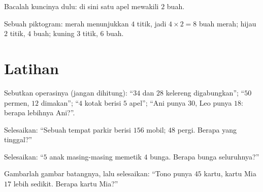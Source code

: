 \begin{example}\label{ex:g2:problems:pictogram}
Bacalah kuncinya dulu: di sini satu apel mewakili $2$ buah.

\begin{omfigure}

{\small Sebuah piktogram: merah menunjukkan $4$ titik, jadi
$4 \times 2 = 8$ buah merah; hijau $2$ titik, $4$ buah; kuning $3$
titik, $6$ buah.}
\end{omfigure}
\end{example}

\section{Latihan}

\begin{exercise}[$\star$]\label{exo:g2:problems:1}
Sebutkan operasinya (jangan dihitung): ``$34$ dan $28$ kelereng
digabungkan''; ``$50$ permen, $12$ dimakan''; ``$4$ kotak berisi $5$
apel''; ``Ani punya $30$, Leo punya $18$: berapa lebihnya Ani?''.
\end{exercise}

\begin{exercise}[$\star$]\label{exo:g2:problems:2}
Selesaikan: ``Sebuah tempat parkir berisi $156$ mobil; $48$ pergi. Berapa yang tinggal?''
\end{exercise}

\begin{exercise}[$\star$]\label{exo:g2:problems:3}
Selesaikan: ``$5$ anak masing-masing memetik $4$ bunga. Berapa bunga
seluruhnya?''
\end{exercise}

\begin{exercise}[$\star$]\label{exo:g2:problems:4}
Gambarlah gambar batangnya, lalu selesaikan: ``Tono punya $45$ kartu,
kartu Mia $17$ lebih sedikit. Berapa kartu Mia?''
\end{exercise}

